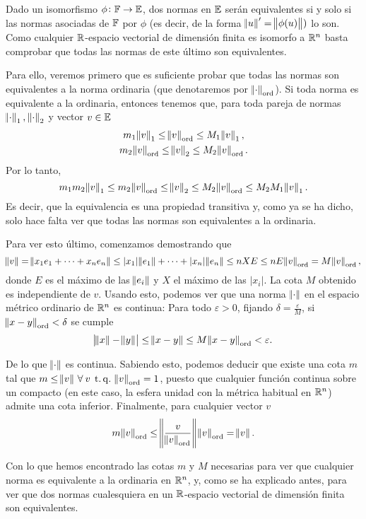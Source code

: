 \begin{eje}
    Dado un isomorfismo $\phi \colon \mathbb{F} \to \mathbb{E}$, dos normas en $\mathbb{E}$ serán equivalentes
    si y solo si las normas asociadas de $\mathbb{F}$ por $\phi$ (es decir, de la forma 
    $\norm{u}'=\norm{\phi(u)})$ lo son.
    Como cualquier $\mathbb{R}$-espacio vectorial de dimensión finita es isomorfo a $\mathbb{R}^n$
    basta comprobar que todas las normas de este último son equivalentes. 

    Para ello, veremos primero que es suficiente probar que todas las normas son 
    equivalentes a la norma ordinaria (que denotaremos por $\norm{\cdot}_{\text{ord}}$). 
    Si toda norma es equivalente a la ordinaria, entonces tenemos que, para toda pareja
    de normas $\norm{\cdot}_1,\,\norm{\cdot}_2$ y vector $v \in \mathbb{E}$ 
    \begin{gather*}
        m_1 \norm{v}_1 \leq \norm{v}_{\text{ord}} \leq M_1 \norm{v}_1, \\
        m_2 \norm{v}_{\text{ord}} \leq \norm{v}_2 \leq M_2 \norm{v}_{\text{ord}}.\\
    \end{gather*}
    Por lo tanto,
    \[
        m_1 m_2 \norm{v}_1 \leq m_2 \norm{v}_{\text{ord}} \leq \norm{v}_2 \leq 
        M_2 \norm{v}_{\text{ord}} \leq M_2  M_1 \norm{v}_1.
    \]
    Es decir, que la equivalencia es una propiedad transitiva y, como ya se ha dicho,
    solo hace falta ver que todas las normas son equivalentes a la ordinaria.

    Para ver esto último, comenzamos demostrando que
    \[
        \norm{v} = \norm{x_1e_1 + \dots + x_ne_n} \leq |x_1|\norm{e_1} + \dots + |x_n|
        \norm{e_n} \leq nXE \leq nE \norm{v}_{\text{ord}}=M\norm{v}_{\text{ord}},
    \]
    donde $E$ es el máximo de las $\norm{e_i}$ y $X$ el máximo de las $|x_i|$.
    La cota $M$ obtenido es independiente de $v$.
    Usando esto, podemos ver que una norma $\norm{\cdot}$
    en el espacio métrico ordinario de $\mathbb{R}^n$ es continua:
    Para todo $\varepsilon > 0$, fijando $\delta = \frac{\varepsilon}{M}$, si
    $\norm{x-y}_{\text{ord}} < \delta$ se cumple
    \[
        \abs{\norm{x} - \norm{y}} \leq \norm{x-y} \leq M\norm{x-y}_{\text{ord}} < 
        \varepsilon.
    \]
    
    De lo que $\norm{\cdot}$ es continua. Sabiendo esto, podemos deducir que existe
    una cota $m$ tal que $m \leq \norm{v} \, \forall \: v \operatorname{\;t.q.\;} 
    \norm{v}_\text{ord}=1$, 
    puesto que cualquier función continua sobre un compacto (en este caso, la esfera
    unidad con la m\'etrica habitual en $\mathbb{R}^n$) admite una cota inferior. Finalmente,
    para cualquier vector $v$
    \[
        m\norm{v}_{\text{ord}} \leq \norm{\frac{v}{\norm{v}_\text{ord}}} 
        \norm{v}_{\text{ord}} = \norm{v}.
    \]

    Con lo que hemos encontrado las cotas $m$ y $M$ necesarias para ver que
    cualquier norma es equivalente a la ordinaria en $\mathbb{R}^n$, y, como se ha explicado
    antes, para ver que dos normas cualesquiera en un $\mathbb{R}$-espacio
    vectorial de dimensión finita son equivalentes.
\end{eje}


